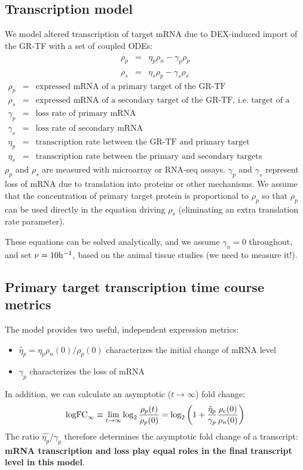 \documentclass[aspb,landscape]{a0poster}
\begin{document}
\begin{multicols}{3}
  \subsection*{Transcription model}

  We model altered transcription of target mRNA due to DEX-induced import of the GR-TF with a set of coupled ODEs:
  \begin{eqnarray*}
    \dot{\rho_p} &=& \eta_p \rho_n  - \gamma_p \rho_p  \\
    \dot{\rho_s} &=& \eta_s \rho_p  - \gamma_s \rho_s 
  \end{eqnarray*}
  \begin{eqnarray*}
    \rho_p &=& \text{expressed mRNA of a primary target of the GR-TF} \\
    \rho_s &=& \text{expressed mRNA of a secondary target of the GR-TF, i.e. target of a primary target} \\
    \gamma_p &=& \text{loss rate of primary mRNA} \\
    \gamma_s &=& \text{loss rate of secondary mRNA} \\
    \eta_p &=& \text{transcription rate between the GR-TF and primary target} \\
    \eta_s &=& \text{transcription rate between the primary and secondary targets}
  \end{eqnarray*}
  $\rho_p$ and $\rho_s$ are measured with microarray or RNA-seq assays. $\gamma_p$ and  $\gamma_s$ represent loss of mRNA due to translation into proteins or other mechanisms. We assume that the concentration
  of primary target protein is proportional to $\rho_p$ so that $\rho_p$ can be used directly in the equation driving $\rho_s$ (eliminating an extra translation rate parameter).

  These equations can be solved analytically, and we assume $\gamma_n=0$ throughout, and set $\nu=10 {\rm h}^{-1}$, based on the animal tissue studies (we need to measure it!).
  
  \subsection*{Primary target transcription time course metrics}

  The model provides two useful, independent expression metrics:
  \begin{itemize}
    \item $\hat{\eta}_p  = \eta_p \rho_n(0) / \rho_p(0)$ characterizes the initial change of mRNA level
    \item $\gamma_p$ characterizes the loss of mRNA
  \end{itemize}
  In addition, we can calculate an asymptotic ($t\rightarrow\infty$) fold change:
  \begin{equation*}
    {\rm logFC}_\infty \equiv \lim_{t \to \infty} \log_2\frac{\rho_p(t)}{\rho_p(0)} = \log_2\left(1 + \frac{\hat{\eta}_p}{\gamma_p} \frac{\rho_c(0)}{\rho_n(0)} \right)
  \end{equation*}
  The ratio $\hat{\eta_p}/\gamma_p$ therefore determines the asymptotic fold change of a transcript: \textbf{mRNA transcription and loss play equal roles in the final transcript level in this model}.


\end{multicols}
\end{document}
